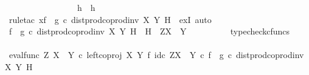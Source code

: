 \begin{isabellebody}
\ \ \ \ \ \ \ \ \ \ \ \ \ \ \ \ \ h{}\ {\isacharequal}{\kern0pt}\ h{\isacharparenright}{\kern0pt}{\isachardoublequoteclose}\isanewline
\ \ \ \ \isamarkupfalse%
\ {\isacharparenleft}{\kern0pt}rule{\isacharunderscore}{\kern0pt}tac\ x{\isacharequal}{\kern0pt}{\isachardoublequoteopen}{\isacharparenleft}{\kern0pt}f\isactrlsup {\isasymflat}\ {\isasymamalg}\ g\isactrlsup {\isasymflat}\ {\isasymcirc}\isactrlsub c\ dist{\isacharunderscore}{\kern0pt}prod{\isacharunderscore}{\kern0pt}coprod{\isacharunderscore}{\kern0pt}inv{}\ X\ Y\ H{\isacharparenright}{\kern0pt}\isactrlsup {\isasymsharp}{\isachardoublequoteclose}\ \ exI{\isacharcomma}{\kern0pt}\ auto{\isacharparenright}{\kern0pt}\isanewline
\ \ \ \ \ \ \isamarkupfalse%
\ {\isachardoublequoteopen}{\isacharparenleft}{\kern0pt}f\isactrlsup {\isasymflat}\ {\isasymamalg}\ g\isactrlsup {\isasymflat}\ {\isasymcirc}\isactrlsub c\ dist{\isacharunderscore}{\kern0pt}prod{\isacharunderscore}{\kern0pt}coprod{\isacharunderscore}{\kern0pt}inv{}\ X\ Y\ H{\isacharparenright}{\kern0pt}\isactrlsup {\isasymsharp}\ {\isacharcolon}{\kern0pt}\ H\ {\isasymrightarrow}\ Z\isactrlbsup {\isacharparenleft}{\kern0pt}X\ {\isasymCoprod}\ Y{\isacharparenright}{\kern0pt}\isactrlesup {\isachardoublequoteclose}\isanewline
\ \ \ \ \ \ \ \ \isamarkupfalse%
\ typecheck{\isacharunderscore}{\kern0pt}cfuncs\isanewline
\ \ \ \ \isamarkupfalse%
\isanewline
\ \ \ \ \ \ \isamarkupfalse%
\ {\isachardoublequoteopen}{\isacharparenleft}{\kern0pt}eval{\isacharunderscore}{\kern0pt}func\ Z\ {\isacharparenleft}{\kern0pt}X\ {\isasymCoprod}\ Y{\isacharparenright}{\kern0pt}\ {\isasymcirc}\isactrlsub c\ left{\isacharunderscore}{\kern0pt}coproj\ X\ Y\ {\isasymtimes}\isactrlsub f\ id\isactrlsub c\ {\isacharparenleft}{\kern0pt}Z\isactrlbsup {\isacharparenleft}{\kern0pt}X\ {\isasymCoprod}\ Y{\isacharparenright}{\kern0pt}\isactrlesup {\isacharparenright}{\kern0pt}{\isacharparenright}{\kern0pt}\isactrlsup {\isasymsharp}\ {\isasymcirc}\isactrlsub c\ {\isacharparenleft}{\kern0pt}f\isactrlsup {\isasymflat}\ {\isasymamalg}\ g\isactrlsup {\isasymflat}\ {\isasymcirc}\isactrlsub c\ dist{\isacharunderscore}{\kern0pt}prod{\isacharunderscore}{\kern0pt}coprod{\isacharunderscore}{\kern0pt}inv{}\ X\ Y\ H{\isacharparenright}{\kern0pt}\isactrlsup {\isasymsharp}\ {\isacharequal}{\kern0pt}\ \isanewline

\end{isabellebody}
